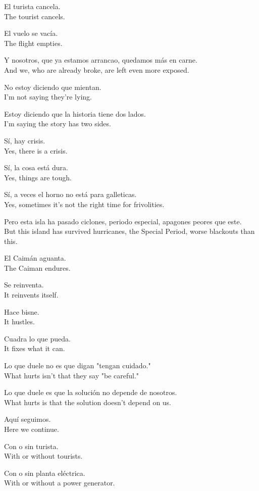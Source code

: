 \documentclass[12pt]{article}
\begin{document}
El turista cancela.\\
The tourist cancels.

El vuelo se vacía.\\
The flight empties.

Y nosotros, que ya estamos arrancao, quedamos más en carne.\\
And we, who are already broke, are left even more exposed.

No estoy diciendo que mientan.\\
I'm not saying they're lying.

Estoy diciendo que la historia tiene dos lados.\\
I'm saying the story has two sides.

Sí, hay crisis.\\
Yes, there is a crisis.

Sí, la cosa está dura.\\
Yes, things are tough.

Sí, a veces el horno no está para galleticas.\\
Yes, sometimes it's not the right time for frivolities.

Pero esta isla ha pasado ciclones, periodo especial, apagones peores que este.\\
But this island has survived hurricanes, the Special Period, worse blackouts than this.

El Caimán aguanta.\\
The Caiman endures.

Se reinventa.\\
It reinvents itself.

Hace bisne.\\
It hustles.

Cuadra lo que pueda.\\
It fixes what it can.

Lo que duele no es que digan "tengan cuidado."\\
What hurts isn't that they say "be careful."

Lo que duele es que la solución no depende de nosotros.\\
What hurts is that the solution doesn't depend on us.

Aquí seguimos.\\
Here we continue.

Con o sin turista.\\
With or without tourists.

Con o sin planta eléctrica.\\
With or without a power generator.
\end{document}
